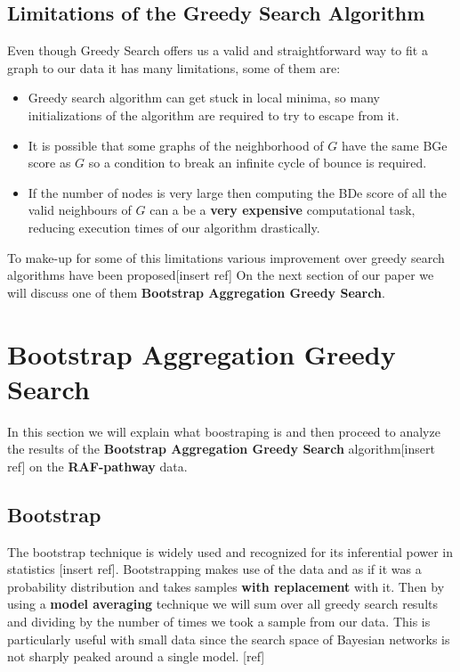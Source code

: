 \documentclass{article}
\begin{document}
	\subsection{Limitations of the Greedy Search Algorithm}
	Even though Greedy Search offers us a valid and straightforward way to fit a
	graph to our data it has many limitations, some of them are:
	\begin{itemize}
		\item Greedy search algorithm can get stuck in local minima, so many
			initializations of the algorithm are required to try to escape from it. 
		\item It is possible that some graphs of the neighborhood of $G$ have the
			same BGe score as $G$ so a condition to break an infinite cycle of bounce
			is required.
		\item If the number of nodes is very large then computing the BDe score of
			all the valid neighbours of $G$ can a be a \textbf{very expensive}
			computational task, reducing execution times of our algorithm
			drastically.
	\end{itemize}
	To make-up for some of this limitations various improvement over greedy
	search algorithms have been proposed[insert ref] On the next section of our
	paper we will discuss one of them \textbf{Bootstrap Aggregation Greedy Search}.
	\section{Bootstrap Aggregation Greedy Search}
	In this section we will explain what boostraping is and then proceed to analyze the results of the \textbf{Bootstrap
	Aggregation Greedy Search} algorithm[insert ref] on the \textbf{RAF-pathway} data.
	\subsection{Bootstrap}
	The bootstrap technique is widely used and recognized for its inferential
	power in statistics [insert ref]. Bootstrapping makes use of the data and as
	if it was a probability distribution and takes samples \textbf{with replacement}
	with it. Then by using a \textbf{model averaging} technique we will sum over all greedy search
	results and dividing by the number of times we took a sample from our data. 
	This is particularly useful with small data since the search space of Bayesian networks is
	not sharply peaked around a single model. [ref]
\end{document}
